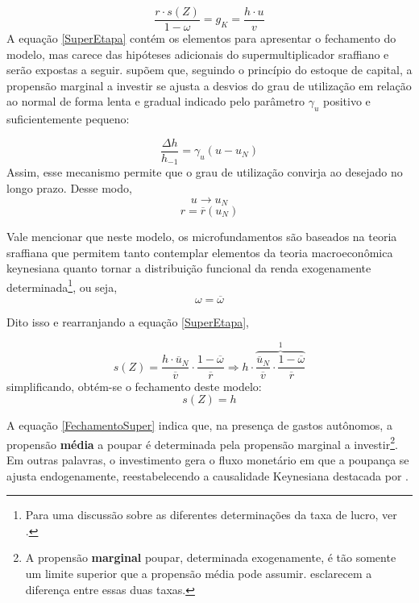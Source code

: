 \begin{equation}
\label{SuperEtapa}
\frac{r\cdot s(Z)}{1 - \omega} = g_K = \frac{h\cdot u}{v}    
\end{equation}
A equação \ref{SuperEtapa} contém os elementos para apresentar o fechamento do modelo, mas carece das hipóteses adicionais do supermultiplicador sraffiano e serão expostas a seguir. \textcite{freitas_growth_2015} supõem que, seguindo o princípio do estoque de capital, a propensão marginal a investir se ajusta a desvios do grau de utilização em relação ao normal de forma lenta e gradual indicado pelo parâmetro $\gamma_u$ positivo e suficientemente pequeno:

$$
\frac{\Delta h}{h_{-1}} = \gamma_u (u - u_N)
$$
Assim, esse mecanismo permite que o grau de utilização convirja ao desejado no longo prazo. Desse modo,
$$
u \to u_N
$$
$$
r = \overline r(u_N)
$$

Vale mencionar que neste modelo, os microfundamentos são baseados na teoria sraffiana que permitem tanto contemplar elementos da teoria macroeconômica keynesiana quanto tornar a distribuição funcional da renda exogenamente determinada\footnote{Para uma discussão sobre as diferentes determinações da taxa de lucro, ver \textcite{serrano_teoria_1988}.}, ou seja,
$$
\omega = \overline \omega
$$

Dito isso e rearranjando a equação \ref{SuperEtapa}, 

$$
s(Z) = \frac{h\cdot \overline u_N}{\overline v}\cdot \frac{1-\overline \omega}{\overline r} \Rightarrow h\cdot \overbrace{\frac{\overline u_N}{\overline v}\cdot \frac{1-\overline \omega}{\overline r}}^{1}
$$
simplificando, obtém-se o fechamento deste modelo:
\begin{equation}
\label{FechamentoSuper}
    s(Z) = h
\end{equation}

A equação \ref{FechamentoSuper} indica que, na presença de gastos autônomos, a propensão \textbf{média} a poupar é determinada pela propensão marginal a investir\footnote{A propensão \textbf{marginal} poupar, determinada exogenamente, é tão somente um limite superior que a propensão média pode assumir. \textcite[p.~51--52]{serrano_o_2000} esclarecem a diferença entre essas duas taxas.}. Em outras palavras, o investimento gera o fluxo monetário em que a poupança se ajusta endogenamente, reestabelecendo a causalidade Keynesiana destacada por \textcite[Original de 1962]{garegnani_problem_2015}. 

